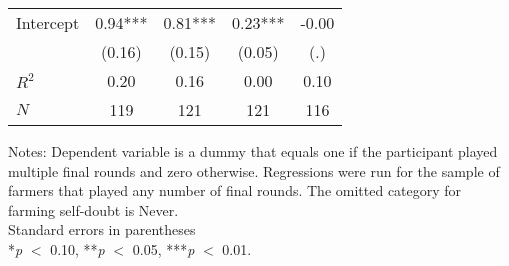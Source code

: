 \begin{table}[htbp]
\begin{threeparttable}
\begin{tabular}{l cccc}
Intercept           &        0.94***&        0.81***&        0.23***&       -0.00   \\
                    &      (0.16)   &      (0.15)   &      (0.05)   &         (.)   \\
\hline
$R^2$               &        0.20   &        0.16   &        0.00   &        0.10   \\
$N$                 &         119   &         121   &         121   &         116   \\
\hline
\hline
\end{tabular}
\begin{tablenotes}
\footnotesize
\item{Notes: Dependent variable is a dummy that equals one if                 the participant played multiple final rounds and zero otherwise.                 Regressions were run for the sample of farmers that played any number                 of final rounds. The omitted category for farming self-doubt is Never.                 \\ Standard errors in parentheses                 \\ *\textit{p} $<$ 0.10, **\textit{p} $<$ 0.05, ***\textit{p} $<$ 0.01.}
\end{tablenotes}
\end{threeparttable}
\end{table}
